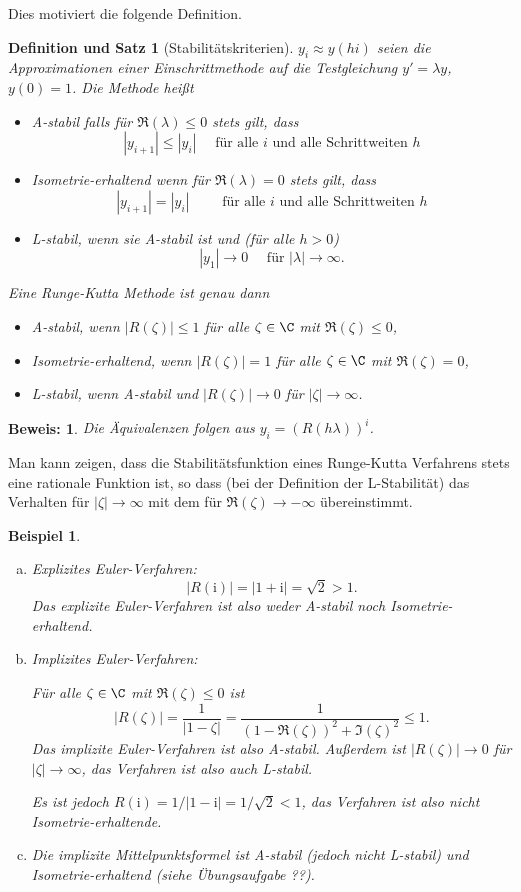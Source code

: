 \documentclass[
]{mycourse}
\theoremstyle{mythm}
\newtheorem{beispiel}[theorem]{Beispiel}
\newtheorem{definitiontheorem}[theorem]{Definition und Satz}
\theoremstyle{break}
\newtheorem*{beweis}{Beweis:}
\renewcommand{\im}{\ensuremath{\mathrm{i}}} 			      	%
\begin{document}
Dies motiviert die folgende Definition.
\begin{definitiontheorem}[Stabilitätskriterien] \label{defthm:stability}
$y_i\approx y(hi)$ seien die Approximationen einer Einschrittmethode auf die Testgleichung $y'=\lambda y$, $y(0)=1$.
Die Methode heißt
\begin{itemize}
\item \emph{A-stabil} falls für $\Re(\lambda)\leq 0$ stets gilt, dass
\[
|y_{i+1}|\leq |y_i| \quad \mbox{ für alle $i$ und alle Schrittweiten $h$}
\]
\item \emph{Isometrie-erhaltend} wenn für $\Re(\lambda)=0$ stets gilt, dass
\[
|y_{i+1}|=|y_i|\quad \quad \mbox{ für alle $i$ und alle Schrittweiten $h$}
\]
\item \emph{L-stabil}, wenn sie A-stabil ist und (für alle $h>0$) 
\[
|y_1|\to 0 \quad \mbox{ für } |\lambda|\to \infty.
\]
\end{itemize}
Eine Runge-Kutta Methode ist genau dann
\begin{itemize}
\item A-stabil, wenn $|R(\zeta)|\leq 1$ für alle $\zeta\in \C$ mit $\Re(\zeta)\leq 0$,
\item Isometrie-erhaltend, wenn $|R(\zeta)|=1$ für alle $\zeta\in \C$ mit $\Re(\zeta)= 0$,
\item L-stabil, wenn A-stabil und $|R(\zeta)|\to 0$ für $|\zeta|\to \infty$.
\end{itemize}
\end{definitiontheorem}
\begin{beweis}
Die Äquivalenzen folgen aus $y_i=(R(h\lambda))^i$.
\end{beweis}

Man kann zeigen, dass die Stabilitätsfunktion eines Runge-Kutta Verfahrens stets eine rationale Funktion ist, so
dass (bei der Definition der L-Stabilität) das Verhalten für $|\zeta|\to \infty$ mit dem für $\Re(\zeta)\to -\infty$ übereinstimmt.

\begin{beispiel}
\begin{enumerate}[(a)]
\item Explizites Euler-Verfahren:
\[
|R(\im)|=|1+\im|=\sqrt{2}>1.
\]
Das explizite Euler-Verfahren ist also weder A-stabil noch Isometrie-erhaltend.
%
\item Implizites Euler-Verfahren:

Für alle $\zeta\in \C$ mit $\Re(\zeta)\leq 0$ ist
\[
|R(\zeta)|=\frac{1}{|1-\zeta|}=\frac{1}{(1-\Re(\zeta))^2+\Im(\zeta)^2}\leq 1.
\]
Das implizite Euler-Verfahren ist also A-stabil. Außerdem ist $|R(\zeta)|\to 0$ für $|\zeta|\to \infty$, das Verfahren ist also auch L-stabil.

Es ist jedoch $R(\im)=1/|1-\im|=1/\sqrt{2}< 1$, das Verfahren ist also nicht Isometrie-erhaltende.
\item Die implizite Mittelpunktsformel ist A-stabil (jedoch nicht L-stabil) und Isometrie-erhaltend (siehe Übungsaufgabe ??).
\end{enumerate}
\end{beispiel}
\end{document}
